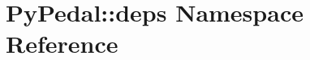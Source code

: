 \hypertarget{namespacePyPedal_1_1deps}{
\section{PyPedal::deps Namespace Reference}
\label{namespacePyPedal_1_1deps}
}


